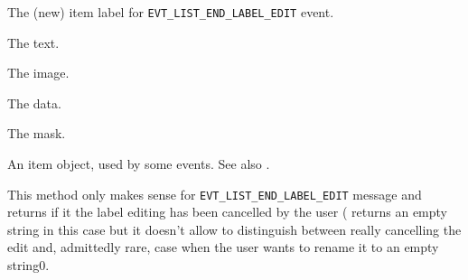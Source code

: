 
The (new) item label for \texttt{EVT\_LIST\_END\_LABEL\_EDIT} event.


\label{wxlisteventgettext}


The text.


\label{wxlisteventgetimage}


The image.


\label{wxlisteventgetdata}


The data.


\label{wxlisteventgetmask}


The mask.


\label{wxlisteventgetitem}


An item object, used by some events. See also .


\label{wxlisteventiseditcancelled}


This method only makes sense for \texttt{EVT\_LIST\_END\_LABEL\_EDIT} message
and returns \true if it the label editing has been cancelled by the user
( returns an empty string in this case
but it doesn't allow to distinguish between really cancelling the edit and,
admittedly rare, case when the user wants to rename it to an empty string0.


